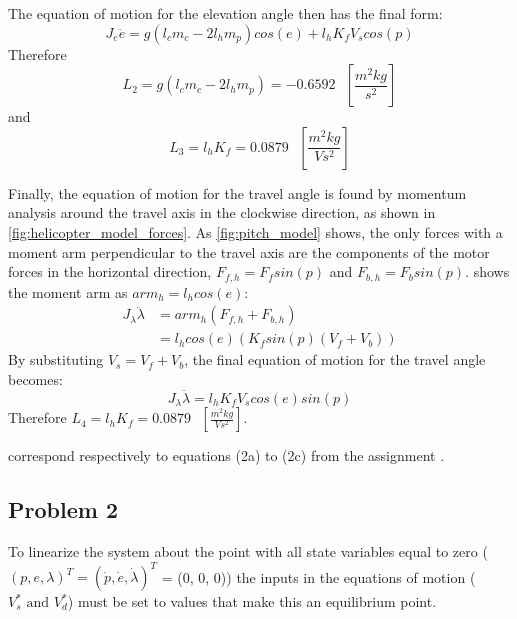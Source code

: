 The equation of motion for the elevation angle then has the final form:
\begin{equation}
  \label{eq:elevation EoM}
  J_e\ddot{e} = g(l_cm_c - 2l_hm_p)cos(e) + l_hK_fV_scos(p)
\end{equation}
%
Therefore
\begin{equation*}
L_2 = g(l_cm_c-2l_hm_p) = -0.6592 \text{ } [\frac{m^2kg}{s^2}]
\end{equation*}
and
\begin{equation*}
L_3 = l_{h}K_{f} = 0.0879 \text{ } [\frac{m^2kg}{Vs^2}]
\end{equation*}

Finally, the equation of motion for the travel angle is found by
momentum analysis around the travel axis in the  clockwise direction, as
shown in \cref{fig:helicopter_model_forces}. As \cref{fig:pitch_model}
shows, the only forces with a moment arm
perpendicular to the travel axis are the components of the motor
forces in the horizontal direction, $F_{f,h} = F_fsin(p)$ and $F_{b,h}
= F_bsin(p)$.  shows the moment arm as $arm_h = l_hcos(e)$:
%
\begin{align*}
  J_\lambda\ddot{\lambda} &= arm_h(F_{f,h} + F_{b,h}) \\
                         &= l_hcos(e)(K_fsin(p)(V_f + V_b))
\end{align*}
%
By substituting $V_s = V_f + V_b$, the final equation of
motion for the travel angle becomes:
%
\begin{equation}
  \label{eq:travel EoM}
  J_\lambda\ddot{\lambda} = l_hK_fV_scos(e)sin(p)
\end{equation}
%
Therefore $L_4 = l_hK_f = 0.0879 \text{ } [\frac{m^2kg}{Vs^2}]$.

  correspond respectively to equations
(2a) to (2c) from the assignment \cite[p.13]{assignment}.
%
\subsection{Problem 2}
To linearize the system about the point with all state variables equal
to zero ($(p, e, \lambda)^T = (\dot{p},\dot{e},\dot{\lambda})^T $ = (0, 0, 0))
the inputs in the equations of motion ($V^{*}_{s} \text{ and }
V^{*}_{d}$) must be set to values that make this an equilibrium point.

